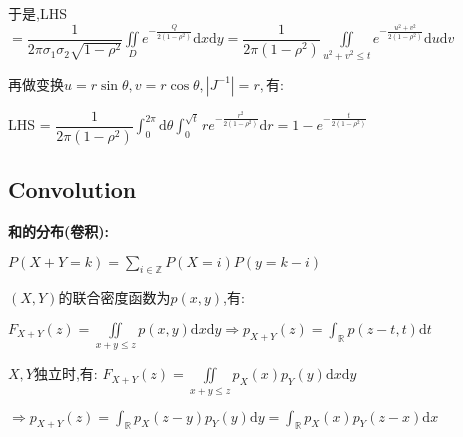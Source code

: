 \begin{enumerate}
    于是,LHS$ =\dfrac{1}{2\pi\sigma_1\sigma_2\sqrt{1-\rho^2}}\iint\limits_{D}e^{-\frac{Q}{2(1-\rho^2)}}\mathrm{d}x\mathrm{d}y = \dfrac{1}{2\pi(1-\rho^2)}\iint\limits_{u^2+v^2\le t}e^{-\frac{u^2+v^2}{2(1-\rho^2)}}\mathrm{d}u\mathrm{d}v$

    再做变换$ u = r\sin\theta, v=r\cos\theta, |J^{-1}| = r,有:$

    LHS = $\dfrac{1}{2\pi(1-\rho^2)}\int_{0}^{2\pi}{\mathrm{d}\theta}\int_{0}^{\sqrt{t}}{re^{-\frac{r^2}{2(1-\rho^2)}}\mathrm{d}r}  = 1-e^{-\frac{t}{2(1-\rho^2)}}$

\end{enumerate}

\subsection{Convolution}
\textbf{和的分布(卷积):}

$P(X+Y=k) = \sum_{i\in \mathbb{Z}}{P(X=i)P(y=k-i)}$

$(X,Y)$的联合密度函数为$ p(x,y)$,有:

$F_{X+Y}(z) = \iint\limits_{x+y\le z}p(x,y)\mathrm{d}x\mathrm{d}y \Rightarrow p_{X+Y}(z)=\int_{\mathbb{R}}p(z-t,t)\mathrm{d}t$

$X,Y$独立时,有: $F_{X+Y}(z) = \iint\limits_{x+y\le z}p_X(x)p_Y(y)\mathrm{d}x\mathrm{d}y $

$\Rightarrow p_{X+Y}(z)= \int_{\mathbb{R}}p_X(z-y)p_Y(y)\mathrm{d}y=\int_{\mathbb{R}}{p_X(x)p_Y(z-x)\mathrm{d}x}$

